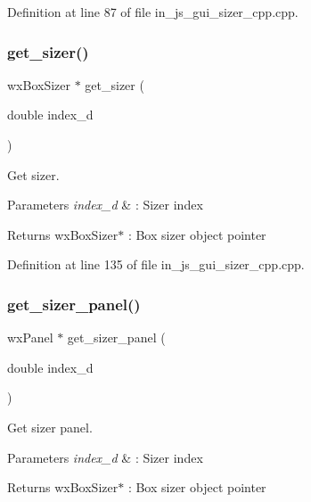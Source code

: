 Definition at line 87 of file in\+\_\+js\+\_\+gui\+\_\+sizer\+\_\+cpp.\+cpp.

\mbox{\label{group___sizer_gac4b3f4eed65111c6e2aafb97733264cf}} 
\subsubsection{get\_sizer()}
{\footnotesize\ttfamily wx\+Box\+Sizer $\ast$ get\+\_\+sizer (\begin{DoxyParamCaption}\item[{double}]{index\+\_\+d }\end{DoxyParamCaption})}



Get sizer. 


\begin{DoxyParams}{Parameters}
{\em index\+\_\+d} & \+: Sizer index \\
\hline
\end{DoxyParams}
\begin{DoxyReturn}{Returns}
wx\+Box\+Sizer$\ast$ \+: Box sizer object pointer 
\end{DoxyReturn}


Definition at line 135 of file in\+\_\+js\+\_\+gui\+\_\+sizer\+\_\+cpp.\+cpp.

\mbox{\label{group___sizer_ga505e8cc5282fc14f547b1da967ebc44a}} 
\subsubsection{get\_sizer\_panel()}
{\footnotesize\ttfamily wx\+Panel $\ast$ get\+\_\+sizer\+\_\+panel (\begin{DoxyParamCaption}\item[{double}]{index\+\_\+d }\end{DoxyParamCaption})}



Get sizer panel. 


\begin{DoxyParams}{Parameters}
{\em index\+\_\+d} & \+: Sizer index \\
\hline
\end{DoxyParams}
\begin{DoxyReturn}{Returns}
wx\+Box\+Sizer$\ast$ \+: Box sizer object pointer 
\end{DoxyReturn}


